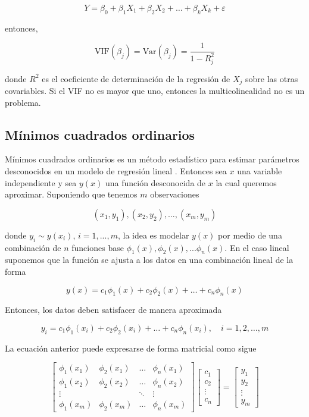 \[
Y=\beta_{0}+\beta_{1} X_{1}+\beta_{2} X_{2}+\ldots+\beta_{k} X_{k}+\varepsilon
\]

entonces,

\[
\text{VIF}(\beta_j) = \text{Var}(\beta_j) = \frac{1}{1-R_{j}^{2}}
\]

donde $R^2$ es el coeficiente de determinación de la regresión de $X_j$ sobre las otras covariables. Si el VIF no es mayor que uno, entonces la multicolinealidad no es un problema.

\subsection{Mínimos cuadrados ordinarios}

Mínimos cuadrados ordinarios es un método estadístico para estimar parámetros desconocidos en un modelo de regresión lineal \parencite{juarez4toColoquioDepartamento2010}. Entonces sea $x$ una variable independiente y sea $y(x)$ una función desconocida de $x$ la cual queremos aproximar. Suponiendo que tenemos $m$ observaciones

\[
\left(x_{1}, y_{1}\right),\left(x_{2}, y_{2}\right), \ldots,\left(x_{m}, y_{m}\right)
\]

donde $y_i \sim y(x_i)$, $i=1,...,m$, la idea es modelar $y(x)$ por medio de una combinación de $n$ funciones base $\phi_1(x),\phi_2(x),...\phi_n(x)$. En el caso lineal suponemos que la función se ajusta a los datos en una combinación lineal de la forma 

\[
y(x)=c_{1} \phi_{1}(x)+c_{2} \phi_{2}(x)+\ldots+c_{n} \phi_{n}(x)
\]

Entonces, los datos deben satisfacer de manera aproximada

\[
y_{i}=c_{1} \phi_{1}\left(x_{i}\right)+c_{2} \phi_{2}\left(x_{i}\right)+\ldots+c_{n} \phi_{n}\left(x_{i}\right), \quad i=1,2, \ldots, m
\]

La ecuación anterior puede expresarse de forma matricial como sigue

\[
\left[\begin{array}{cccc}
	\phi_{1}\left(x_{1}\right) & \phi_{2}\left(x_{1}\right) & \ldots & \phi_{n}\left(x_{1}\right) \\
	\phi_{1}\left(x_{2}\right) & \phi_{2}\left(x_{2}\right) & \ldots & \phi_{n}\left(x_{2}\right) \\
	\vdots & & \ddots & \vdots \\
	\phi_{1}\left(x_{m}\right) & \phi_{2}\left(x_{m}\right) & \ldots & \phi_{n}\left(x_{m}\right)
\end{array}\right]\left[\begin{array}{c}
	c_{1} \\
	c_{2} \\
	\vdots \\
	c_{n}
\end{array}\right]=\left[\begin{array}{c}
	y_{1} \\
	y_{2} \\
	\vdots \\
	y_{m}
\end{array}\right]
\]

